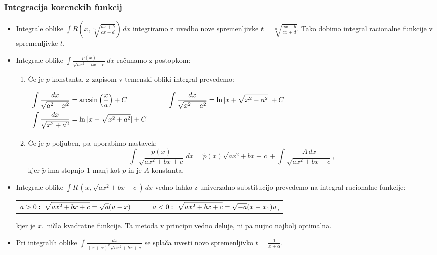 \subsubsection{Integracija korenckih funkcij}
\begin{itemize}
    \item Integrale oblike $\displaystyle \int R(x, \sqrt[n]{\frac{ax+b}{cx+d}}) \, dx$ integriramo z uvedbo nove spremenljivke $t = \sqrt[n]{\frac{ax+b}{cx+d}}$. Tako dobimo integral racionalne funkcije v spremenljivke $t$.
    \item Integrale oblike $\displaystyle \int \frac{p(x)}{\sqrt{ax^2+bx+c}} \, dx$ računamo z postopkom:
    \begin{enumerate}
        \item Če je $p$ konstanta, z zapisom v temenski obliki integral prevedemo:
        \begin{center}
            \begin{tabular}{ l r }
            \(\displaystyle \int \frac{dx}{\sqrt{a^2-x^2}} = \arcsin \left(\frac{x}{a}\right) + C\) & \(\displaystyle \qquad \int \frac{dx}{\sqrt{x^2 - a^2}} = \ln |x + \sqrt{x^2-a^2}| + C\) \\
            \(\displaystyle \int \frac{dx}{\sqrt{x^2 + a^2}} = \ln|x+\sqrt{x^2+a^2}| + C\)
            \end{tabular}
        \end{center}
        \item Če je $p$ poljuben, pa uporabimo nastavek:
        $$\displaystyle \int \frac{p(x)}{\sqrt{ax^2+bx+c}} \, dx = \widetilde{p}(x) \sqrt{ax^2+bx+c} + \int \frac{A \, dx}{\sqrt{ax^2+bx+c}},$$
        kjer $\widetilde{p}$ ima stopnjo 1 manj kot $p$ in je $A$ konstanta.
    \end{enumerate}
    \item Integrale oblike $\displaystyle \int R \, (x, \sqrt{ax^2+bx+c}) \, dx$ vedno lahko z univerzalno substitucijo prevedemo na integral racionalne funkcije:
    \begin{center}
        \begin{tabular}{ l r }
        \(\ds a>0: \ \sqrt{ax^2+bx+c} = \sqrt{a}(u-x)\) & \(\displaystyle \qquad a<0: \ \sqrt{ax^2+bx+c} = \sqrt{-a}(x-x_1)u\),
        \end{tabular}
    \end{center}
    kjer je $x_1$ ničla kvadratne funkcije. Ta metoda v principu vedno deluje, ni pa nujno najbolj optimalna.
    \item Pri integralih oblike $\displaystyle \int \frac{dx}{(x+\alpha)^k \sqrt{ax^2+bx+c}}$ se splača uvesti novo spremenljivko $t = \frac{1}{x+\alpha}$.
\end{itemize}


